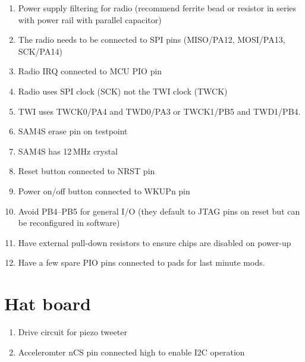 \documentclass[a4paper, 12pt]{article}
\begin{document}
\begin{enumerate}
\item Power supply filtering for radio (recommend ferrite bead or
  resistor in series with power rail with parallel capacitor)

\item The radio needs to be connected to SPI pins (MISO/PA12,
  MOSI/PA13, SCK/PA14)

\item Radio IRQ connected to MCU PIO pin

\item Radio uses SPI clock (SCK) not the TWI clock (TWCK)

\item TWI uses TWCK0/PA4 and TWD0/PA3 or TWCK1/PB5 and TWD1/PB4.

\item SAM4S erase pin on testpoint

\item SAM4S has 12\,MHz crystal

\item Reset button connected to NRST pin

\item Power on/off button connected to WKUPn pin

\item Avoid PB4--PB5 for general I/O (they default to JTAG pins on
  reset but can be reconfigured in software)

\item Have external pull-down resistors to ensure chips are disabled on
  power-up

\item Have a few spare PIO pins connected to pads for last minute mods.

\end{enumerate}


\section{Hat board}

\begin{enumerate}


\item Drive circuit for piezo tweeter



\item Acceleromter nCS pin connected high to enable I2C operation

\end{enumerate}
\end{document}
